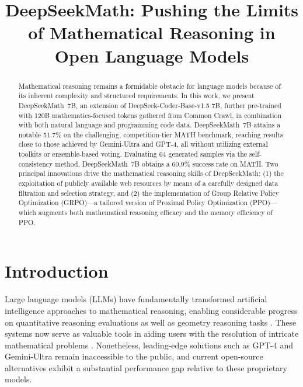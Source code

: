 \title{DeepSeekMath: Pushing the Limits of Mathematical Reasoning in Open Language Models}

\begin{abstract}
Mathematical reasoning remains a formidable obstacle for language models because of its inherent complexity and structured requirements. In this work, we present DeepSeekMath~7B, an extension of DeepSeek-Coder-Base-v1.5 7B, further pre-trained with 120B mathematics-focused tokens gathered from Common Crawl, in combination with both natural language and programming code data. DeepSeekMath~7B attains a notable 51.7\% on the challenging, competition-tier MATH benchmark, reaching results close to those achieved by Gemini-Ultra and GPT-4, all without utilizing external toolkits or ensemble-based voting. Evaluating 64 generated samples via the self-consistency method, DeepSeekMath~7B obtains a 60.9\% success rate on MATH. Two principal innovations drive the mathematical reasoning skills of DeepSeekMath: (1) the exploitation of publicly available web resources by means of a carefully designed data filtration and selection strategy, and (2) the implementation of Group Relative Policy Optimization (GRPO)—a tailored version of Proximal Policy Optimization (PPO)—which augments both mathematical reasoning efficacy and the memory efficiency of PPO.
\end{abstract}

\section{Introduction}

Large language models (LLMs) have fundamentally transformed artificial intelligence approaches to mathematical reasoning, enabling considerable progress on quantitative reasoning evaluations \citep{MATH} as well as geometry reasoning tasks \citep{trinh2024solving}. These systems now serve as valuable tools in aiding users with the resolution of intricate mathematical problems \citep{tao}. Nonetheless, leading-edge solutions such as GPT-4 \citep{gpt4} and Gemini-Ultra \citep{gemini} remain inaccessible to the public, and current open-source alternatives exhibit a substantial performance gap relative to these proprietary models.

